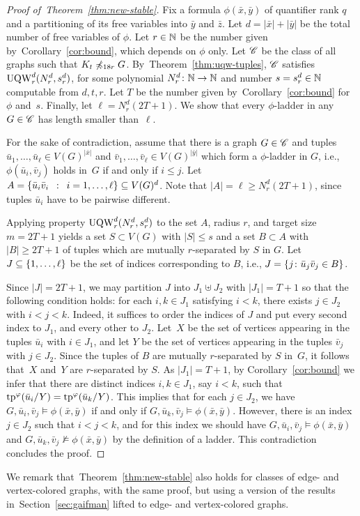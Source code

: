 \begin{proof}[Proof of~Theorem~\ref{thm:new-stable}]
Fix a formula $\phi(\bar x,\bar y)$ of quantifier rank $q$ and
a partitioning of its 
free variables into  $\bar y$ and $\bar z$.
Let $d=|\bar x|+|\bar y|$ be the total number of free variables of $\phi$.
Let $r\in \mathbb{N}$ be the number given by~Corollary~\ref{cor:bound},
which depends on $\phi$ only.
Let $\mathscr{C}$ be the class of all graphs 
such that  $K_t\not\preccurlyeq_{18r} G$.
By~Theorem~\ref{thm:uqw-tuples}, 
$\mathscr{C}$ satisfies $\mathrm{UQW}^d_{r}(N^d_{r},s^d_r)$,
for some  polynomial  $N^d_r\colon\mathbb{N}\to\mathbb{N}$ and number $s=s^d_r\in \mathbb{N}$ computable from $d,t,r$.
Let $T$ be the number given by~Corollary~\ref{cor:bound} for $\phi$ and~$s$.
 Finally, let 
$\ell=N^d_r(2T+1)$.
We show that 
every $\phi$-ladder in any $G\in\mathscr{C}$ has length smaller than~$\ell$.


For the sake of contradiction, assume that there is a graph $G\in\mathscr{C}$
and tuples $\bar u_1,\ldots,\bar u_\ell\in V(G)^{|\bar x|}$ and $ \bar v_1,\ldots, \bar v_\ell\in V(G)^{|\bar y|}$
which form a $\phi$-ladder in $G$, i.e., 
$\phi(\bar u_i,\bar v_j)$ holds in~$G$ if and only if $i\le j$.
	Let $A=\left\{ \bar u_i \bar v_i \,~:~\, i=1,\ldots,\ell \right\}\subseteq V(G)^d$. Note that $|A|=\ell\ge N^d_r(2T+1)$, since tuples $\bar u_i$ have to be pairwise different.
  
Applying property  $\mathrm{UQW}^d_r(N^d_r,s^d_r)$ to the set $A$, radius $r$, and target size $m=2T+1$
		 yields a set $S\subset V(G)$ with $|S|\le s$
	and a set $B\subset A$ with $|B|\geq 2T+1$ 
  of tuples which are  mutually $r$-separated by $S$  in $G$.
  Let $J\subseteq \{1,\ldots,\ell\}$
  be the set of indices corresponding to $B$,
  i.e., $J=\{j\colon\bar u_j\bar v_j\in B\}$.
  
  Since $|J|=2T+1$, we may partition $J$ into $J_1\uplus J_2$ with $|J_1|=T+1$ so that the following condition holds:
  for each $i,k\in J_1$ satisfying $i<k$, there exists $j\in J_2$ with $i<j<k$. Indeed, it suffices to order the indices of $J$ and put every second index to $J_1$, and every other to $J_2$.
  Let~$X$ be the set of vertices appearing in the tuples $\bar u_i$ with $i\in J_1$, and let $Y$ be the set of vertices appearing in the tuples $\bar v_j$ with $j\in J_2$.
  Since the tuples of $B$ are mutually $r$-separated by $S$ in~$G$, it follows that~$X$ and~$Y$ are $r$-separated by $S$.
  As $|J_1|=T+1$, by Corollary~\ref{cor:bound} we infer that there are distinct indices $i,k\in J_1$, say $i<k$, such that $\mathrm{tp}^\varphi(\bar u_i/Y)=
    \mathrm{tp}^\varphi(\bar u_{k}/Y)$. This implies that for each $j\in J_2$, we have $G,\bar u_i,\bar v_j\models \phi(\bar x,\bar y)$ if and only if $G,\bar u_{k},\bar v_j\models \phi(\bar x,\bar y)$.
    However, there is an index $j\in J_2$ such that $i<j<k$, and for this index we should have $G,\bar u_i,\bar v_j\models \phi(\bar x,\bar y)$ and $G,\bar u_{k},\bar v_j\not\models \phi(\bar x,\bar y)$
    by the definition of a ladder. This contradiction concludes the proof.
\end{proof}

\vspace{-0.1cm}
We remark that~Theorem~\ref{thm:new-stable} also holds for classes of edge- and vertex-colored graphs, with the same proof, but using 
a version of the results in~Section~\ref{sec:gaifman} lifted to edge- and vertex-colored graphs.
